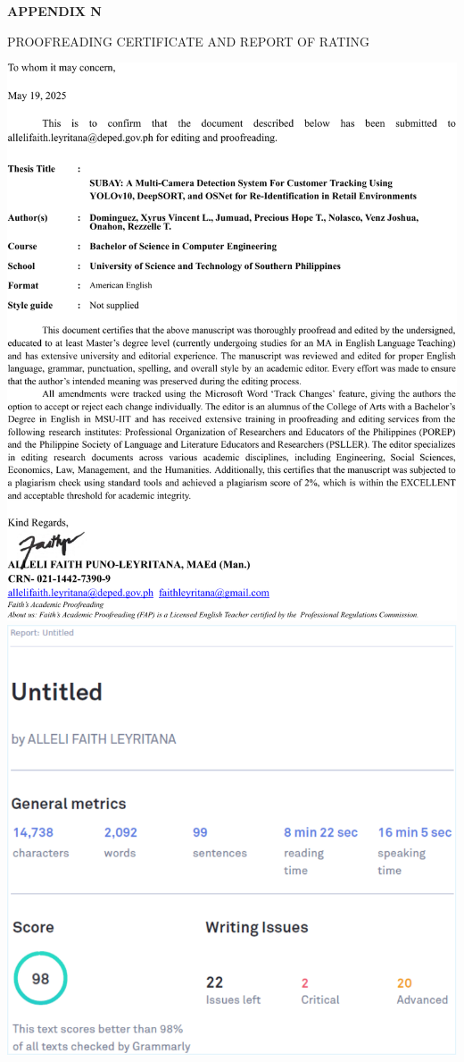 \clearpage

\begin{center}
	{\bf APPENDIX N}
\end{center}

\begin{center}
	PROOFREADING CERTIFICATE AND REPORT OF RATING
\end{center}

\begin{center}
	\includegraphics[width=1\textwidth]{app/K1.pdf}
	\includegraphics[width=\textwidth]{app/K2.pdf}
\end{center}

\clearpage